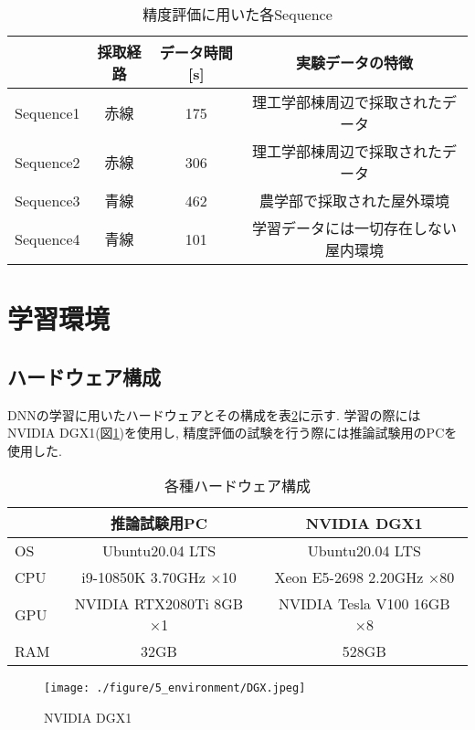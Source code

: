 \begin{table}[htbp]
\begin{center}
\caption{精度評価に用いた各Sequence}
  \begin{tabular}{l c c c}\hline
       &  採取経路 & データ時間[s] & 実験データの特徴 \\ \hline
    Sequence1 & 赤線 & 175 & 理工学部棟周辺で採取されたデータ\\
    Sequence2 & 赤線 & 306 & 理工学部棟周辺で採取されたデータ\\
    Sequence3 & 青線 & 462 & 農学部で採取された屋外環境\\
    Sequence4 & 青線 & 101 & 学習データには一切存在しない屋内環境\\ \hline
  \end{tabular}
  \label{tab:test_sequence}
\end{center}
\end{table}

\section{学習環境}
\subsection{ハードウェア構成}
DNNの学習に用いたハードウェアとその構成を表\ref{tab:pc_spec}に示す. 学習の際にはNVIDIA DGX1(図\ref{fig:DGX1})を使用し, 精度評価の試験を行う際には推論試験用のPCを使用した.

\begin{table}[htbp]
\begin{center}
\caption{各種ハードウェア構成}
  \begin{tabular}{l c c}\hline
       &  推論試験用PC & NVIDIA DGX1 \\ \hline
    OS & Ubuntu20.04 LTS & Ubuntu20.04 LTS\\
    CPU & i9-10850K 3.70GHz ×10 & Xeon E5-2698 2.20GHz ×80\\
    GPU & NVIDIA RTX2080Ti 8GB ×1 & NVIDIA Tesla V100 16GB ×8\\
    RAM & 32GB & 528GB\\ \hline
  \end{tabular}
  \label{tab:pc_spec}
\end{center}
\end{table}

\begin{figure}[thpb]
  \begin{minipage}[htpb]{1.0\hsize}
  \begin{center}
  \texttt{[image: ./figure/5\_environment/DGX.jpeg]}
  \caption{NVIDIA DGX1}
  \label{fig:DGX1}
  \end{center}
  \end{minipage}
\end{figure}

